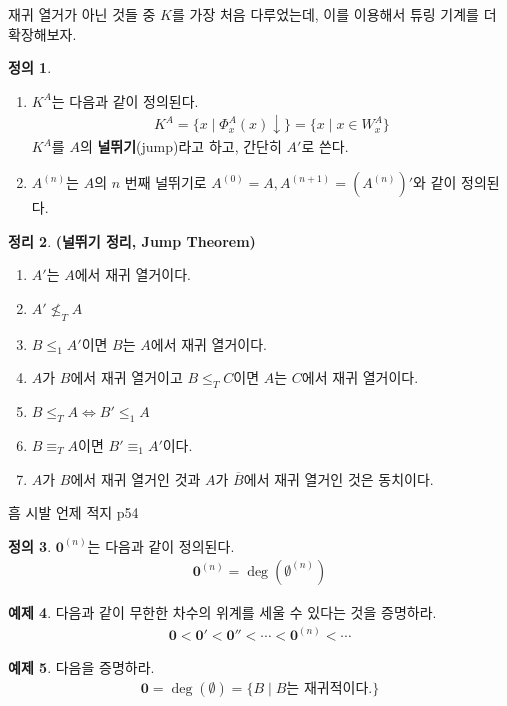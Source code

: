 \documentclass[b5paper, 11pt]{book}
\theoremstyle{definition}
\newtheorem{defn}{정의}[chapter]
\newtheorem{thm}[defn]{정리}
\newtheorem{ex}[defn]{예제}
\newenvironment{pf*}{\pushQED{\qed}\pf}
{\popQED\endpf}
\begin{document}
재귀 열거가 아닌 것들 중 $K$를 가장 처음 다루었는데, 이를 이용해서 튜링 기계를 더 확장해보자. 
\begin{defn}
    \begin{enumerate}
        \item $K^A$는 다음과 같이 정의된다.
        \begin{align*}
            K^A = \{x \;\vert\; \Phi_x^A (x) \downarrow \} = \{ x \; \vert \; x \in W_x^A \}
        \end{align*}
        $K^A$를 $A$의 \textbf{널뛰기}(jump)라고 하고, 간단히 $A'$로 쓴다.
        \item $A^{(n)}$는 $A$의 $n$ 번째 널뛰기로 $A^{(0)} = A, A^{(n+1)} = \left( A^{(n)}\right)'$와 같이 정의된다.
    \end{enumerate}
\end{defn}
\begin{thm}
    \textbf{(널뛰기 정리, Jump Theorem)} 
    \begin{enumerate}
        \item $A'$는 $A$에서 재귀 열거이다.
        \item $A' \nleq_T A$
        \item $B \le_1 A'$이면 $B$는 $A$에서 재귀 열거이다.
        \item $A$가 $B$에서 재귀 열거이고 $B \le_T C$이면 $A$는 $C$에서 재귀 열거이다.
        \item $B \le_T A \Leftrightarrow B' \le_1 A$
        \item $B \equiv_T A$이면 $B' \equiv_1 A'$이다.
        \item $A$가 $B$에서 재귀 열거인 것과 $A$가 $\overline{B}$에서 재귀 열거인 것은 동치이다.
    \end{enumerate}
\end{thm}
\begin{pf*}
    흠 시발 언제 적지 p54
\end{pf*}
\begin{defn}
    $\mathbf{0}^{(n)}$는 다음과 같이 정의된다.
    \begin{align*}
        \mathbf{0}^{(n)} = \deg (\emptyset^{(n)})
    \end{align*}
\end{defn}
\begin{ex}
    다음과 같이 무한한 차수의 위계를 세울 수 있다는 것을 증명하라.
    \begin{align*}
        \mathbf{0} < \mathbf{0}' < \mathbf{0}'' < \cdots < \mathbf{0}^{(n)} < \cdots
    \end{align*}
\end{ex}
\begin{ex}
    다음을 증명하라.
    \begin{align*}
        \mathbf{0} = \deg (\emptyset) = \{B \;\vert\; B\text{는 재귀적이다.}\}
    \end{align*}
\end{ex}
\end{document}
